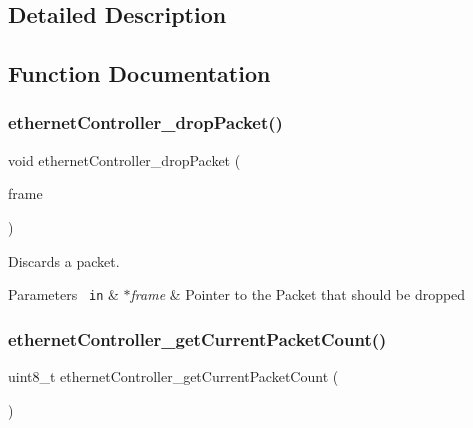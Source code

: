 \subsection{Detailed Description}


\subsection{Function Documentation}
\mbox{\label{group__data__reception_gada8fcdc667d1800b5f963bfc8cea56c2}} 
\subsubsection{\texorpdfstring{ethernetController\_dropPacket()}{ethernetController\_dropPacket()}}
{\footnotesize\ttfamily void ethernet\+Controller\+\_\+drop\+Packet (\begin{DoxyParamCaption}\item[{\mbox{\hyperlink{group__ethernet_ga7519a7ae14b490659069435698d28a25}{ethernet\+Frame\+\_\+t}} $\ast$}]{frame }\end{DoxyParamCaption})}



Discards a packet. 


\begin{DoxyParams}[1]{Parameters}
\mbox{\texttt{ in}}  & {\em $\ast$frame} & Pointer to the Packet that should be dropped \\
\hline
\end{DoxyParams}
\mbox{\label{group__data__reception_ga0ab2398cb48efd9a8943a5c5b2872b0c}} 
\subsubsection{\texorpdfstring{ethernetController\_getCurrentPacketCount()}{ethernetController\_getCurrentPacketCount()}}
{\footnotesize\ttfamily uint8\+\_\+t ethernet\+Controller\+\_\+get\+Current\+Packet\+Count (\begin{DoxyParamCaption}{ }\end{DoxyParamCaption})}



